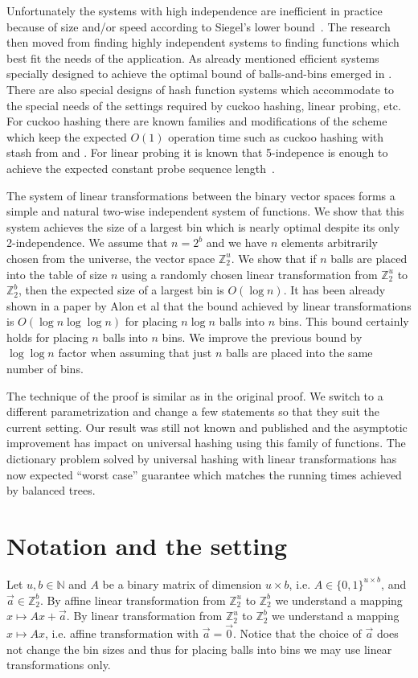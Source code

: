 \documentclass[unicode,review]{siamart1116}
\newcommand{\vecspace}[2]{\mathbb{Z}_{#1}^{#2}}
\newcommand{\binvecspace}[1]{\vecspace{2}{#1}}
\numberwithin{theorem}{section}
\begin{document}
Unfortunately the systems with high independence are inefficient in practice because of size and/or speed according to Siegel's lower bound~\cite{siegel}. 
The research then moved from finding highly independent systems to finding functions which best fit the needs of the application. 
As already mentioned efficient systems specially designed to achieve the optimal bound of balls-and-bins emerged in \cite{celisetal}.
There are also special designs of hash function systems which accommodate to the special needs of the settings required by cuckoo hashing, linear probing, etc.
For cuckoo hashing there are known families and modifications of the scheme which keep the expected $O(1)$ operation time such as cuckoo hashing with stash from \cite{mitzenmacher-cuckoo} and \cite{dietzfelbinger-cuckoo}.
For linear probing it is known that 5-indepence is enough to achieve the expected constant probe sequence length~\cite{linear-probing}.

The system of linear transformations between the binary vector spaces forms a simple and natural two-wise independent system of functions.
We show that this system achieves the size of a largest bin which is nearly optimal despite its only 2-independence.
We assume that $n = 2^b$ and we have $n$ elements arbitrarily chosen from the universe, the vector space $\binvecspace{u}$.
We show that if $n$ balls are placed into the table of size $n$ using a randomly chosen linear transformation from $\binvecspace{u}$ to $\binvecspace{b}$, then the expected size of a largest bin is $O(\log n)$.
It has been already shown in a paper by Alon et al \cite{alonetal} that the bound achieved by linear transformations is $O(\log n \log \log n)$ for placing $n \log n$ balls into $n$ bins.
This bound certainly holds for placing $n$ balls into $n$ bins.
We improve the previous bound by $\log \log n$ factor when assuming that just $n$ balls are placed into the same number of bins.

The technique of the proof is similar as in the original proof. 
We switch to a different parametrization and change a few statements so that they suit the current setting.
Our result was still not known and published and the asymptotic improvement has impact on universal hashing using this family of functions.
The dictionary problem solved by universal hashing with linear transformations has now expected ``worst case'' guarantee which matches the running times achieved by balanced trees.

\section{Notation and the setting}
Let $u, b \in \mathbb{N}$ and $A$ be a binary matrix of dimension $u \times b$, i.e. $A \in \{0, 1\}^{u \times b}$, and $\vec{a} \in \binvecspace{b}$. 
By affine linear transformation from $\binvecspace{u}$ to $\binvecspace{b}$ we understand a mapping $x \mapsto Ax + \vec{a}$.
By linear transformation from $\binvecspace{u}$ to $\binvecspace{b}$
we understand a mapping $x \mapsto Ax$, i.e. affine transformation with $\vec{a} = \vec{0}$.
Notice that the choice of $\vec{a}$ does not change the bin sizes and thus for placing balls into bins we may use linear transformations only.
\end{document}
